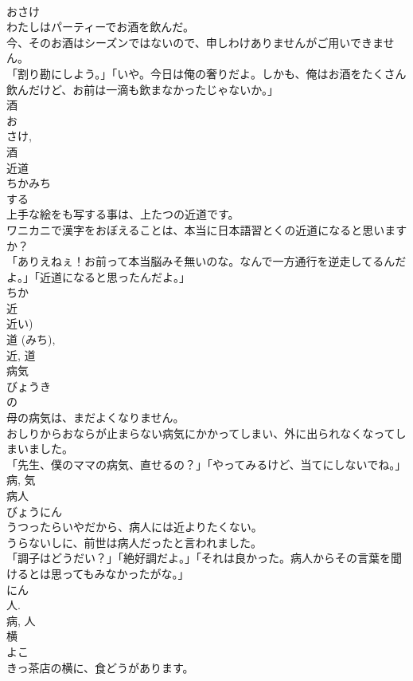\documentclass[8pt]{extreport}
\begin{document}
\begin{CJK}{UTF8}{min}
\\	おさけ	
\\	わたしはパーティーでお酒を飲んだ。	
\\	今、そのお酒はシーズンではないので、申しわけありませんがご用いできません。	
\\	「割り勘にしよう。」「いや。今日は俺の奢りだよ。しかも、俺はお酒をたくさん飲んだけど、お前は一滴も飲まなかったじゃないか。」	
\\	酒 
\\	お 
\\	さけ, 
\\	酒	
\\	近道	
\\	ちかみち	
\\	する 
\\	上手な絵をも写する事は、上たつの近道です。	
\\	ワニカニで漢字をおぼえることは、本当に日本語習とくの近道になると思いますか？	
\\	「ありえねぇ！お前って本当脳みそ無いのな。なんで一方通行を逆走してるんだよ。」「近道になると思ったんだよ。」	
\\	ちか 
\\	近 
\\	近い) 
\\	道 (みち), 
\\	近, 道	
\\	病気	
\\	びょうき	
\\	の 
\\	母の病気は、まだよくなりません。	
\\	おしりからおならが止まらない病気にかかってしまい、外に出られなくなってしまいました。	
\\	「先生、僕のママの病気、直せるの？」「やってみるけど、当てにしないでね。」	
\\	病, 気	
\\	病人	
\\	びょうにん	
\\	うつったらいやだから、病人には近よりたくない。	
\\	うらないしに、前世は病人だったと言われました。	
\\	「調子はどうだい？」「絶好調だよ。」「それは良かった。病人からその言葉を聞けるとは思ってもみなかったがな。」	
\\	にん 
\\	人. 
\\	病, 人	
\\	横	
\\	よこ	
\\	きっ茶店の横に、食どうがあります。	

\end{CJK}
\end{document}
